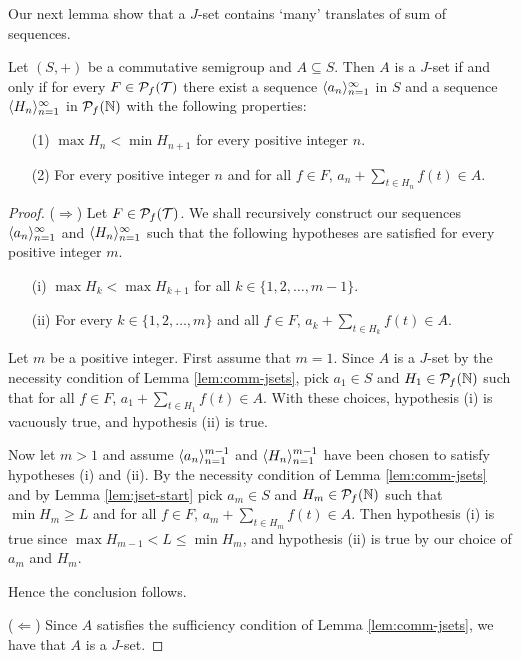 Our next lemma show that a $J$-set contains `many' translates of sum of sequences. 
\begin{lem}
  \label{lem:comm-many}
  Let $(S, +)$ be a commutative semigroup and $A \subseteq S$.
  Then $A$ is a $J$-set if and only if for every $F \in \mathcal{P}_f(\mathcal{T})$ there exist a sequence $\langle a_n \rangle_{n=1}^\infty$ in $S$ and a sequence $\langle H_n \rangle_{n=1}^\infty$ in $\mathcal{P}_f(\mathbb{N})$ with the following properties:
  \begin{itemize}
    \item[(1)]
      $\max H_n < \min H_{n+1}$ for every positive integer $n$.

    \item[(2)]
      For every positive integer $n$ and for all $f \in F$, $a_n + \sum_{t \in H_n} f(t) \in A$. 
  \end{itemize}
\end{lem}
\begin{proof}
  ($\Rightarrow$)
  Let $F \in \mathcal{P}_f(\mathcal{T})$.
  We shall recursively construct our sequences $\langle a_n \rangle_{n=1}^\infty$ and $\langle H_n \rangle_{n=1}^\infty$ such that the following hypotheses are satisfied for every positive integer $m$. 
  \begin{itemize}
    \item[(i)]
      $\max H_k < \max H_{k+1}$ for all $k \in \{1, 2, \ldots, m-1\}$.

    \item[(ii)]
      For every $k \in \{1, 2, \ldots, m\}$ and all $f \in F$, $a_k + \sum_{t \in H_k} f(t) \in A$.
  \end{itemize}

  Let $m$ be a positive integer.
  First assume that $m = 1$. 
  Since $A$ is a $J$-set by the necessity condition of Lemma \ref{lem:comm-jsets}, pick $a_1 \in S$ and $H_1 \in \mathcal{P}_f(\mathbb{N})$ such that for all $f \in F$, $ a_1 + \sum_{t \in H_1} f(t)\in A$. 
  With these choices, hypothesis (i) is vacuously true, and hypothesis (ii) is true.

  Now let $m > 1$ and assume $\langle a_n \rangle_{n=1}^{m-1}$ and $\langle H_n \rangle_{n=1}^{m-1}$ have been chosen to satisfy hypotheses (i) and (ii).
  By the necessity condition of Lemma \ref{lem:comm-jsets} and by Lemma \ref{lem:jset-start} pick $a_m \in S$ and $H_m \in \mathcal{P}_f(\mathbb{N})$ such that $\min H_m \ge L$ and for all $f \in F$, $a_m + \sum_{t \in H_m} f(t) \in A$. 
  Then hypothesis (i) is true since $\max H_{m-1} < L \le \min H_m$, and hypothesis (ii) is true by our choice of $a_m$ and $H_m$. 

  Hence the conclusion follows.

  ($\Leftarrow$)
  Since $A$ satisfies the sufficiency condition of Lemma \ref{lem:comm-jsets}, we have that $A$ is a $J$-set.
\end{proof}

